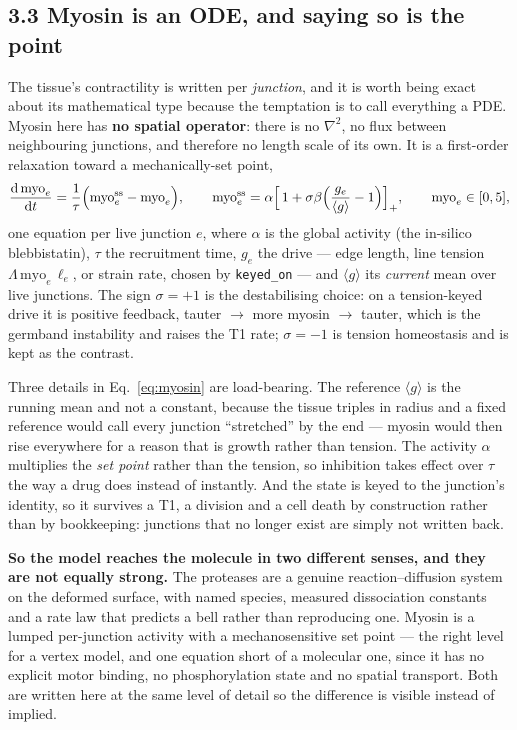 \documentclass[10pt,a4paper]{article}
\newcommand{\code}[1]{\texttt{#1}}
\begin{document}
\subsection*{3.3\; Myosin is an ODE, and saying so is the point}

The tissue's contractility is written per \emph{junction}, and it is worth being exact about its
mathematical type because the temptation is to call everything a PDE. Myosin here has \textbf{no
spatial operator}: there is no $\nabla^2$, no flux between neighbouring junctions, and therefore no
length scale of its own. It is a first-order relaxation toward a mechanically-set point,
%
\begin{equation}
\frac{\mathrm d\,\mathrm{myo}_e}{\mathrm dt}
  = \frac{1}{\tau}\Bigl(\mathrm{myo}^{\rm ss}_e - \mathrm{myo}_e\Bigr),
\qquad
\mathrm{myo}^{\rm ss}_e = \alpha\Bigl[\,1 + \sigma\beta\Bigl(\frac{g_e}{\langle g\rangle}-1\Bigr)\Bigr]_+,
\qquad \mathrm{myo}_e\in[0,5],
\label{eq:myosin}
\end{equation}
%
one equation per live junction $e$, where $\alpha$ is the global activity (the in-silico
blebbistatin), $\tau$ the recruitment time, $g_e$ the drive --- edge length, line tension
$\Lambda\,\mathrm{myo}_e\,\ell_e$, or strain rate, chosen by \code{keyed\_on} --- and $\langle
g\rangle$ its \emph{current} mean over live junctions. The sign $\sigma=+1$ is the destabilising
choice: on a tension-keyed drive it is positive feedback, tauter $\to$ more myosin $\to$ tauter, which
is the germband instability and raises the T1 rate; $\sigma=-1$ is tension homeostasis and is kept as
the contrast.

Three details in Eq.~\eqref{eq:myosin} are load-bearing. The reference $\langle g\rangle$ is the
running mean and not a constant, because the tissue triples in radius and a fixed reference would call
every junction ``stretched'' by the end --- myosin would then rise everywhere for a reason that is
growth rather than tension. The activity $\alpha$ multiplies the \emph{set point} rather than the
tension, so inhibition takes effect over $\tau$ the way a drug does instead of instantly. And the
state is keyed to the junction's identity, so it survives a T1, a division and a cell death by
construction rather than by bookkeeping: junctions that no longer exist are simply not written back.

\textbf{So the model reaches the molecule in two different senses, and they are not equally strong.}
The proteases are a genuine reaction--diffusion system on the deformed surface, with named species,
measured dissociation constants and a rate law that predicts a bell rather than reproducing one.
Myosin is a lumped per-junction activity with a mechanosensitive set point --- the right level for a
vertex model, and one equation short of a molecular one, since it has no explicit motor binding, no
phosphorylation state and no spatial transport. Both are written here at the same level of detail so
the difference is visible instead of implied.
\end{document}

